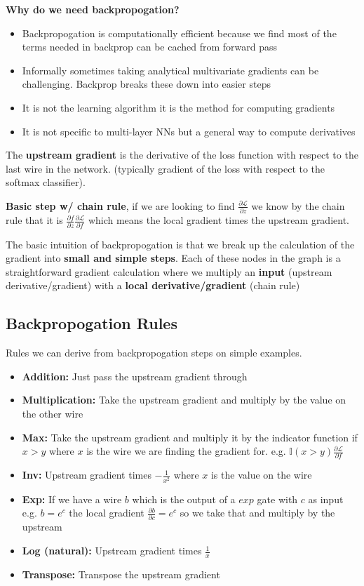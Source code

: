 \documentclass[twocolumn, letter, 10pt, landscape]{article}
\newcommand{\tb}{\textbf}
\newcommand{\bit}{\vspace{-0.1in}\begin{itemize}\setlength\itemsep{-0.05in}}
\newcommand{\eit}{\end{itemize}\vspace{-0.1in}}
\begin{document}
\tb{Why do we need backpropogation?}

\bit{}
\item Backpropogation is computationally efficient because we find most of the terms needed in backprop can be cached from forward pass
\item Informally sometimes taking analytical multivariate gradients can be challenging. Backprop breaks these down into easier steps
\item It is not the learning algorithm it is the method for computing gradients
\item It is not specific to multi-layer NNs but a general way to compute derivatives
\eit{}

The \tb{upstream gradient} is the derivative of the loss function with respect to the last wire in the network. (typically gradient of the loss with respect to the softmax classifier).

\tb{Basic step w/ chain rule}, if we are looking to find $\frac{\partial \mathcal{L}}{\partial z}$ we know by the chain rule that it is $\frac{\partial f}{\partial z} \frac{\partial \mathcal{L}}{\partial f}$ which means the local gradient times the upstream gradient.

The basic intuition of backpropogation is that we break up the calculation of the gradient into \tb{small and simple steps}. Each of these nodes in the graph is a straightforward gradient calculation where we multiply an \tb{input} (upstream derivative/gradient) with a \tb{local derivative/gradient} (chain rule)

\subsection{Backpropogation Rules}
Rules we can derive from backpropogation steps on simple examples.
\bit{}
\item \tb{Addition:} Just pass the upstream gradient through
\item \tb{Multiplication:} Take the upstream gradient and multiply by the value on the other wire
\item \tb{Max:} Take the upstream gradient and multiply it by the indicator function if $x>y$ where $x$ is the wire we are finding the gradient for. e.g. $\mathbb{I}(x>y) \frac{\partial \mathcal{L}}{\partial f}$
\item \tb{Inv:} Upstream gradient times $-\frac{1}{x^2}$ where $x$ is the value on the wire
\item \tb{Exp:} If we have a wire $b$ which is the output of a $exp$ gate with $c$ as input e.g. $b=e^{c}$ the local gradient $\frac{\partial b}{\partial c} = e^c$ so we take that and multiply by the upstream
\item \tb{Log (natural):} Upstream gradient times $\frac{1}{x}$
\item \tb{Transpose:} Transpose the upstream gradient
\eit{}
\end{document}
